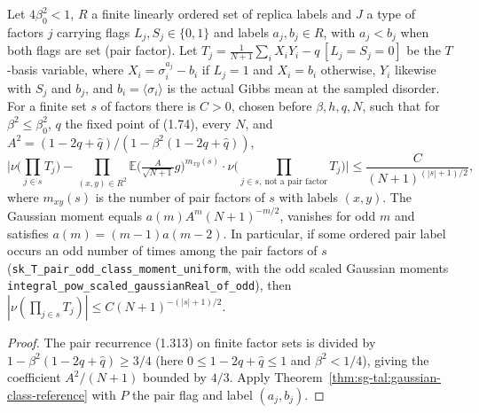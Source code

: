 \begin{theorem}
\label{thm:sg-tal:prop-1104}
\leanok
{}
Let $4\beta_0^2<1$, $R$ a finite linearly ordered set of replica labels and $J$ a type of factors
$j$ carrying flags $L_j,S_j\in\{0,1\}$ and labels $a_j,b_j\in R$, with $a_j<b_j$ when both flags
are set (pair factor). Let $T_j=\frac1{N+1}\sum_iX_iY_i-q\,[L_j=S_j=0]$ be the $T$-basis variable, where
$X_i=\sigma^{a_j}_i-b_i$ if $L_j=1$ and $X_i=b_i$ otherwise, $Y_i$ likewise with $S_j$ and $b_j$, and
$b_i=\langle\sigma_i\rangle$ is the actual Gibbs mean at the sampled disorder. For a finite set $s$ of
factors there is $C>0$, chosen before $\beta,h,q,N$, such that for $\beta^2\le\beta_0^2$, $q$ the
fixed point of (1.74), every $N$, and $A^2=(1-2q+\hat q)/(1-\beta^2(1-2q+\hat q))$,
\[
 \Big|\nu\Big(\prod_{j\in s}T_j\Big)-\prod_{(x,y)\in R^2}\mathbb E\Big(\tfrac{A}{\sqrt{N+1}}g\Big)^{m_{xy}(s)}
 \cdot\nu\Big(\prod_{j\in s,\ \text{not a pair factor}}T_j\Big)\Big|\le\frac{C}{(N+1)^{(|s|+1)/2}},
\]
where $m_{xy}(s)$ is the number of pair factors of $s$ with labels $(x,y)$. The Gaussian moment
equals $a(m)A^m(N+1)^{-m/2}$, vanishes for odd $m$ and satisfies $a(m)=(m-1)a(m-2)$.
In particular, if some ordered pair label occurs an odd number of times among the pair factors of
$s$ (\texttt{sk\_T\_pair\_odd\_class\_moment\_uniform}, with the odd scaled Gaussian moments
\texttt{integral\_pow\_scaled\_gaussianReal\_of\_odd}), then $|\nu(\prod_{j\in s}T_j)|\le C(N+1)^{-(|s|+1)/2}$.
\end{theorem}
\begin{proof}
\leanok
The pair recurrence (1.313) on finite factor sets is divided by
$1-\beta^2(1-2q+\hat q)\ge3/4$ (here $0\le1-2q+\hat q\le1$ and $\beta^2<1/4$), giving the coefficient
$A^2/(N+1)$ bounded by $4/3$. Apply Theorem~\ref{thm:sg-tal:gaussian-class-reference} with
$P$ the pair flag and label $(a_j,b_j)$.
\end{proof}

